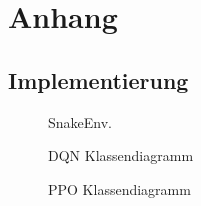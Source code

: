 \chapter{Anhang}

\section{Implementierung}
\begin{figure}[H]
	\centering
	
	\caption[SnakeEnv Klassendiagramm]{SnakeEnv.}
	\label{fig:Anhang_SnakeEnv}
\end{figure}
\newpage
\begin{figure}[H]
	\centering
	
	\caption[DQN Klassendiagramm]{DQN Klassendiagramm}
	\label{fig:Anhang_DQN_Klassendiagramm}
\end{figure}
\begin{figure}[H]
	\centering
	
	\caption[PPO Klassendiagramm]{PPO Klassendiagramm}
	\label{fig:Anhang_PPO_Klassendiagramm}
\end{figure}